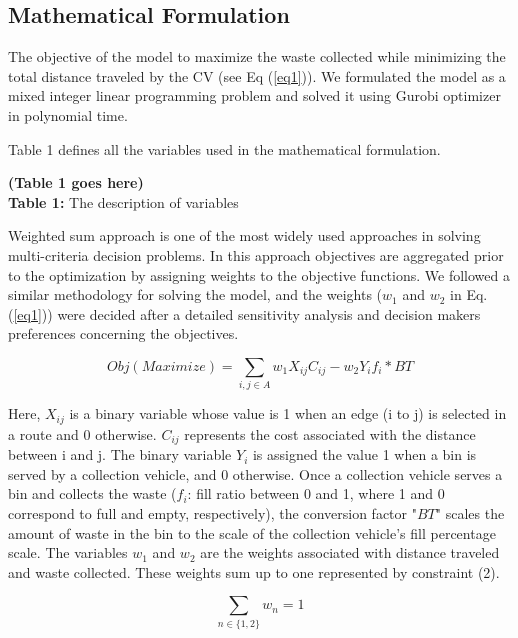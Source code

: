 \documentclass[12pt]{article}
\begin{document}
\subsection {Mathematical Formulation}

The objective of the model to maximize the waste collected while minimizing the total distance traveled by the CV (see Eq (\ref{eq1})). We formulated the model as a mixed integer linear programming problem and solved it using Gurobi optimizer \parencite{gurobi} in polynomial time.

Table 1 defines all the variables used in the mathematical formulation.
\begin{center}
    \textbf{(Table 1 goes here)}\\
    \textbf{Table 1:} The description of variables
\end{center}

Weighted sum approach is one of the most widely used approaches in solving multi-criteria decision problems. In this approach objectives are aggregated prior to the optimization by assigning weights to the objective functions. We followed a similar methodology for solving the model, and the weights ($w_1$ and $w_2$ in Eq. (\ref{eq1})) were decided after a detailed sensitivity analysis and decision makers preferences concerning the objectives.

\begin{equation}\label{eq1}
    Obj(Maximize)=\sum_{i,j \in A} w_1 X_{ij} C_{ij} - w_2 Y_i f_i * BT
\end{equation}

Here, $X_{ij}$ is a binary variable whose value is 1 when an edge (i to j) is selected in a route and 0 otherwise. $C_{ij}$ represents the cost associated with the distance between i and j. The binary variable $Y_{i}$ is assigned the value 1 when a bin is served by a collection vehicle, and 0 otherwise. Once a collection vehicle serves a bin and collects the waste ($f_i$: fill ratio between 0 and 1, where 1 and 0 correspond to full and empty, respectively), the conversion factor "$BT$" scales the amount of waste in the bin to the scale of the collection vehicle's fill percentage scale. The variables $w_1$ and $w_2$ are the weights associated with distance traveled and waste collected. These weights sum up to one represented by constraint (2).

\begin{equation}\label{eq1.5}
    \sum_{n\in \{1,2\}} w_n = 1
\end{equation}
\end{document}
